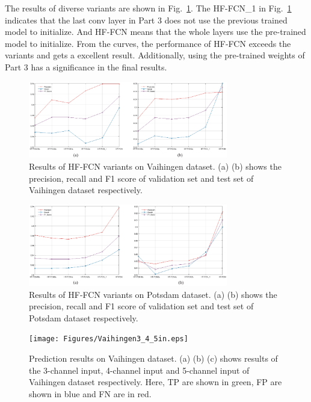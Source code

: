 The results of diverse variants are shown in Fig.~\ref{fig:Vaihingen-variants}. The HF-FCN\_1 in Fig.~\ref{fig:Vaihingen-variants} indicates that the last conv layer in Part 3 does not use the previous trained model to initialize. And HF-FCN means that the whole layers use the pre-trained model to initialize. From the curves, the performance of HF-FCN exceeds the variants and gets a excellent result. Additionally, using the pre-trained weights of Part 3 has a significance in the final results.

\begin{figure}
\vspace{-0.2cm}
\setlength{\abovecaptionskip}{-0cm}
\setlength{\belowcaptionskip}{-1cm}  
\centering
\includegraphics[width=8.7cm]{Figures/vaihingen_variants.eps}
\caption{Results of HF-FCN variants on Vaihingen dataset. (a) (b) shows the precision, recall and F1 score of validation set and test set of Vaihingen dataset respectively.}
\label{fig:Vaihingen-variants}
\end{figure}

\begin{figure}
\vspace{-0.4cm}
\setlength{\abovecaptionskip}{-0cm}
\setlength{\belowcaptionskip}{-2cm}  
\centering
\includegraphics[width=8.7cm]{Figures/Potsdam_variants.eps}
\caption{Results of HF-FCN variants on Potsdam dataset. (a) (b) shows the precision, recall and F1 score of validation set and test set of Potsdam dataset respectively.}
\label{fig:Potsdam-variants}
\end{figure}

\begin{figure}
\vspace{-0.45cm}
\setlength{\abovecaptionskip}{-0cm}
\setlength{\belowcaptionskip}{-2cm}  
\centering
\texttt{[image: Figures/Vaihingen3\_4\_5in.eps]}
\caption{Prediction results on Vaihingen dataset. (a) (b) (c) shows results of the 3-channel input, 4-channel input and 5-channel input of Vaihingen dataset respectively. Here, TP are shown in green, FP are shown in blue and FN are in red.}
\label{fig:Vaihingen-3-4-5in}
\end{figure}

